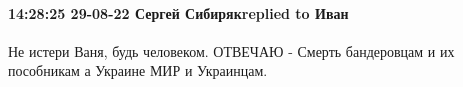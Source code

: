  
 
 
 
 

\paragraph{14:28:25 29-08-22 Сергей Сибирякreplied to Иван}

Не истери Ваня, будь человеком.
ОТВЕЧАЮ - Смерть бандеровцам и их пособникам а Украине МИР и Украинцам.
